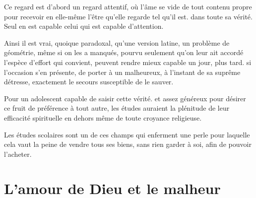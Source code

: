 \documentclass[french,twoside]{book} %
\newcommand\chapteropen{} %
\newcommand\chapterclose{} %
\begin{document}
Ce regard est d'abord un regard attentif, où l'âme se vide de tout contenu propre pour recevoir en elle-même l'être qu'elle regarde tel qu'il est. dans toute sa vérité. Seul en est capable celui qui est capable d'attention.\par
Ainsi il est vrai, quoique paradoxal, qu'une version latine, un problème de géométrie, même si on les a manqués, pourvu seulement qu'on leur ait accordé l'espèce d'effort qui convient, peuvent rendre mieux capable un jour, plus tard. si l'occasion s'en présente, de porter à un malheureux, à l'instant de sa suprême détresse, exactement le secours susceptible de le sauver.\par
Pour un adolescent capable de saisir cette vérité. et assez généreux pour désirer ce fruit de préférence à tout autre, les études auraient la plénitude de leur efficacité spirituelle en dehors même de toute croyance religieuse.\par
Les études scolaires sont un de ces champs qui enferment une perle pour laquelle cela vaut la peine de vendre tous ses biens, sans rien garder à soi, afin de pouvoir l'acheter.\par

\begin{center}
\noindent \centerline{}
\end{center}

\chapterclose


\chapteropen
\chapter[{L'amour de Dieu et le malheur}]{L'amour de Dieu et le malheur}
\end{document}

